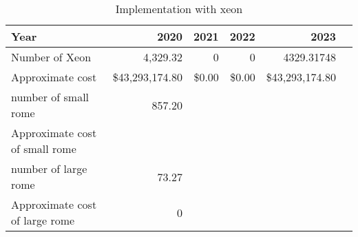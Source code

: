 \tiny \begin{longtable} { |p{}  |r  |r  |r  |r  |r |} 
\caption{Implementation with xeon \label{tab:Xeon}}\\ 
\hline 
\textbf{Year}&\textbf{2020}&\textbf{2021}&\textbf{2022}&\textbf{2023} \\ \hline
{Number of Xeon}&{4,329.32}&{0}&{0}&{4329.31748} \\ \hline
{Approximate cost}&{\$43,293,174.80}&{\$0.00}&{\$0.00}&{\$43,293,174.80} \\ \hline
{number of small rome }&{857.20}&&& \\ \hline
{Approximate cost of small rome }&&&& \\ \hline
{number of large rome }&{73.27}&&& \\ \hline
{Approximate cost of large rome }&{0}&&& \\ \hline
\end{longtable} \normalsize
